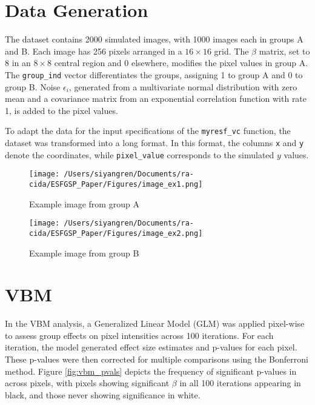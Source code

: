 \documentclass[12pt]{article}
\begin{document}
\section*{Data Generation}

The dataset contains 2000 simulated images, with 1000 images each in groups A and B. Each image has 256 pixels arranged in a \(16 \times 16\) grid. The \(\beta\) matrix, set to 8 in an \(8 \times 8\) central region and 0 elsewhere, modifies the pixel values in group A. The \texttt{group\_ind} vector differentiates the groups, assigning 1 to group A and 0 to group B. Noise \(\epsilon_i\), generated from a multivariate normal distribution with zero mean and a covariance matrix from an exponential correlation function with rate 1, is added to the pixel values.

To adapt the data for the input specifications of the \texttt{myresf\_vc} function, the dataset was transformed into a long format. In this format, the columns \texttt{x} and \texttt{y} denote the coordinates, while \texttt{pixel\_value} corresponds to the simulated $y$ values.

\begin{figure}[H]
    \centering
    \begin{minipage}[b]{0.45\textwidth}
        \texttt{[image: /Users/siyangren/Documents/ra-cida/ESFGSP\_Paper/Figures/image\_ex1.png]}
        \caption{Example image from group A}
    \end{minipage}
    \hfill %
    \begin{minipage}[b]{0.45\textwidth}
        \texttt{[image: /Users/siyangren/Documents/ra-cida/ESFGSP\_Paper/Figures/image\_ex2.png]}
        \caption{Example image from group B}
    \end{minipage}
\end{figure}

\section*{VBM}

In the VBM analysis, a Generalized Linear Model (GLM) was applied pixel-wise to assess group effects on pixel intensities across 100 iterations. For each iteration, the model generated effect size estimates and p-values for each pixel. These p-values were then corrected for multiple comparisons using the Bonferroni method. Figure \ref{fig:vbm_pvals} depicts the frequency of significant p-values in across pixels, with pixels showing significant \(\beta\) in all 100 iterations appearing in black, and those never showing significance in white.
\end{document}
